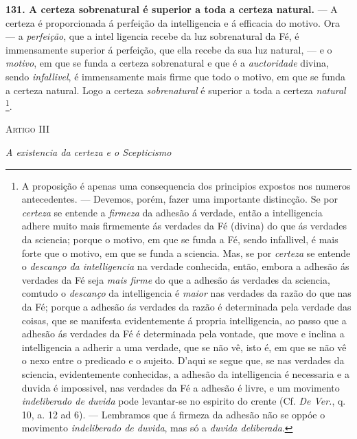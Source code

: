 \textbf{131. A certeza sobrenatural é superior a toda a certeza natural.} --- A certeza é proporcionada á perfeição da intelligencia e á efficacia do motivo. Ora --- a \emph{perfeição}, que a intel  ligencia recebe da luz sobrenatural da Fé, é immensamente superior á perfeição, que ella recebe da sua luz natural, --- e o   \emph{motivo}, em que se funda a certeza sobrenatural e que é a \emph{auctoridade} divina, sendo \emph{infallivel}, é immensamente mais firme que todo o motivo, em que se funda a certeza natural. Logo a certeza \emph{sobrenatural} é superior a toda a certeza \emph{natural} \footnote{A proposição é apenas uma consequencia dos principios expostos nos numeros antecedentes. --- Devemos, porém, fazer uma importante distincção. Se por \emph{certeza} se entende a \emph{firmeza} da adhesão á verdade, então a intelligencia adhere muito mais firmemente ás verdades da Fé (divina) do que ás verdades da sciencia; porque o motivo, em que se funda a Fé, sendo infallivel, é mais forte que o motivo, em que se funda a sciencia. Mas, se por \emph{certeza} se entende o \emph{descanço da intelligencia} na verdade conhecida, então, embora a adhesão ás verdades da Fé seja \emph{mais firme} do que a adhesão ás verdades da sciencia, comtudo o \emph{descanço} da intelligencia é \emph{maior} nas verdades da razão do que nas da Fé; porque a adhesão ás verdades da razão é determinada pela verdade das coisas, que se manifesta evidentemente á propria intelligencia, ao passo que a adhesão ás verdades da Fé é determinada pela vontade, que move e inclina a intelligencia a adherir a uma verdade, que se não vê, isto é, em que se não vê o nexo entre o predicado e o sujeito. D'aqui se segue que, se nas verdades da sciencia, evidentemente conhecidas, a adhesão da intelligencia é necessaria e a duvida é impossivel, nas verdades da Fé a adhesão é livre, e um movimento \emph{indeliberado de duvida} pode levantar-se no espirito do crente (Cf. \emph{De Ver.}, q. 10, a. 12 ad 6). --- Lembramos que á firmeza da adhesão não se oppóe o movimento \emph{indeliberado de duvida}, mas só a \emph{duvida deliberada}.}.

\textsc{Artigo} III

\emph{A existencia da certeza e o Scepticismo}


